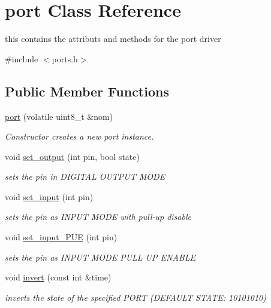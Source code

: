 \hypertarget{classport}{\section{port Class Reference}
\label{classport}
}


this contains the attributs and methods for the port driver  




{\ttfamily \#include $<$ports.\-h$>$}

\subsection*{Public Member Functions}
\begin{DoxyCompactItemize}
\item 
\hyperlink{classport_ac802d7443286c5e9e5b6b18e6d92b803}{port} (volatile uint8\-\_\-t \&nom)
\begin{DoxyCompactList}\small\item\em Constructor creates a new port instance. \end{DoxyCompactList}\item 
void \hyperlink{classport_ac7a0ac9d9d0c29ddcd6561830a1f848a}{set\-\_\-output} (int pin, bool state)
\begin{DoxyCompactList}\small\item\em sets the pin in D\-I\-G\-I\-T\-A\-L O\-U\-T\-P\-U\-T M\-O\-D\-E \end{DoxyCompactList}\item 
void \hyperlink{classport_a55687ade5fe370dcd855c7b8b6242ceb}{set\-\_\-input} (int pin)
\begin{DoxyCompactList}\small\item\em sets the pin as I\-N\-P\-U\-T M\-O\-D\-E with pull-\/up disable \end{DoxyCompactList}\item 
void \hyperlink{classport_afec3e5ae926d7184c273f127c53dd273}{set\-\_\-input\-\_\-\-P\-U\-E} (int pin)
\begin{DoxyCompactList}\small\item\em sets the pin as I\-N\-P\-U\-T M\-O\-D\-E P\-U\-L\-L U\-P E\-N\-A\-B\-L\-E \end{DoxyCompactList}\item 
void \hyperlink{classport_aa0d4a6e02cc7610e5f50a9aa0e1654c2}{invert} (const int \&time)
\begin{DoxyCompactList}\small\item\em inverts the state of the specified P\-O\-R\-T (D\-E\-F\-A\-U\-L\-T S\-T\-A\-T\-E\-: 10101010) \end{DoxyCompactList}\end{DoxyCompactItemize}
